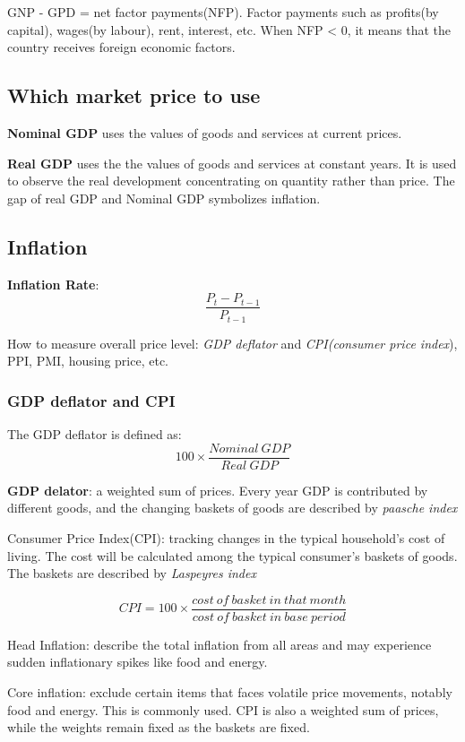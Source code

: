 \documentclass[10pt, a4paper]{article}
\begin{document}
            GNP - GPD = net factor payments(NFP). Factor payments such as profits(by capital), wages(by labour), rent, interest, etc. When NFP < 0, it means that the country receives foreign economic factors. 

        \subsection{Which market price to use}
            \textbf{Nominal GDP} uses the values of goods and services at current prices. 

            \textbf{Real GDP} uses the the values of goods and services at constant years. It is used to observe the real development concentrating on quantity rather than price. The gap of real GDP and Nominal GDP symbolizes inflation. 
        \subsection{Inflation} 
            \textbf{Inflation Rate}: $$\frac{P_t - P_{t - 1}}{P_{t - 1}}$$
            
            How to measure overall price level: \emph{GDP deflator} and \emph{CPI(consumer price index}), PPI, PMI, housing price, etc. 

            \subsubsection{GDP deflator and CPI}
            The GDP deflator is defined as:
             $$100 \times \frac{Nominal\ GDP}{Real\ GDP}$$
            
             \textbf{GDP delator}: a weighted sum of prices. Every year GDP is contributed by different goods, and the changing baskets of goods are described by \emph{paasche index}

             Consumer Price Index(CPI): tracking changes in the typical household's cost of living. The cost will be calculated among the typical consumer's baskets of goods. The baskets are described by \emph{Laspeyres index}

             $$CPI = 100 \times \frac{cost\ of\ basket\ in\ that\ month}{cost\ of\  basket\ in\ base\ period}$$

            Head Inflation: describe the total inflation from all areas and may experience sudden inflationary spikes like food and energy. 

            Core inflation: exclude certain items that faces volatile price movements, notably food and energy. This is commonly used.  CPI is also a weighted sum of prices, while the weights remain fixed as the  baskets are fixed. 
\end{document}
